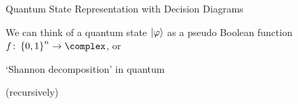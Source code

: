\begin{frame}[fragile]{Quantum State Representation with
					\alert{Decision Diagrams}}

\vspace{-1em}
We can think of a quantum state $\ket{\varphi}$ as a pseudo Boolean function $f \colon \set{0,1}^n \to \complex$, or

\begin{block}{`Shannon decomposition' in quantum}

\centering

\vspace{.5em}


\vspace{.5em}

\hfill (recursively)

\vspace{.5em}
\end{block}


\end{frame}
